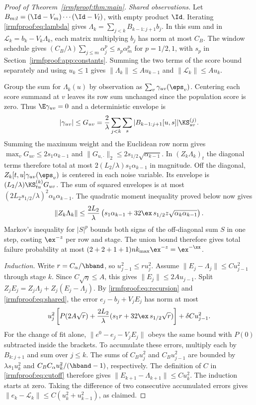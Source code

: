 \begin{proof}[Proof of Theorem~\ref{irmfproof:thm:main}]
\emph{Shared observations.}
Let \(B_{m:l}=(\Id-V_m)\cdots(\Id-V_l)\), with empty product \(\Id\).
Iterating \eqref{irmfproof:eq:lambda} gives
\(\Lambda_k=\sum_{j<k}B_{k-1:j+1}b_j\). In this sum and in
\(\mathcal L_k=b_k-V_k\Lambda_k\), each matrix multiplying \(b_j\) has norm
at most \(C_B\). The window schedule gives
\((C_B/\lambda)\sum_{j\le m}\alpha_j^p\le s_p\alpha_m^p\) for
\(p=1/2,1\), with \(s_p\) in Section~\ref{irmfproof:app:constants}.
Summing the two terms of the score bound separately and using \(u_k\le1\)
gives \(\|\Lambda_k\|\le A u_{k-1}\) and \(\|\mathcal L_k\|\le A u_k\).

Group the sum for \(\Lambda_k(u)\) by observation as
\(\sum_v\gamma_{uv}(\eps_v)\). Centering each score summand at \(v\)
leaves its row sum unchanged since the population score is zero. Thus
\(\E\gamma_{uv}=0\) and a deterministic envelope is
\[
 |\gamma_{uv}|\le G_{uv}
 =\frac{2}{\lambda}\sum_{j<k}\sum_s|B_{k-1:j+1}[u,s]|\KS_{sv}^{(j)} .
\]
Summing the maximum weight and the Euclidean row norm gives
\(\max_v G_{uv}\le2s_1\alpha_{k-1}\) and
\(\|G_{u,\cdot}\|_2\le2s_{1/2}\sqrt{\alpha_{k-1}}\).
In \((Z_k\Lambda_k)_t\) the diagonal terms therefore total at most
\(2(L_2/\lambda)s_1\alpha_{k-1}\) in magnitude. Off the diagonal,
\(Z_k[t,u]\gamma_{uv}(\eps_v)\) is centered in each noise variable.
Its envelope is \((L_2/\lambda)\KS_{tu}^{(k)}G_{uv}\).
The sum of squared envelopes is at most
\((2L_2 s_{1/2}/\lambda)^2\alpha_k\alpha_{k-1}\).
The quadratic moment inequality proved below now gives
\begin{equation}\label{irmfproof:eq:shared}
 \|Z_k\Lambda_k\|\le\frac{2L_2}{\lambda}
 \left(s_1\alpha_{k-1}+32\ex\,s_{1/2}z\sqrt{\alpha_k\alpha_{k-1}}\right) .
\end{equation}
Markov's inequality for \(|S|^p\) bounds both signs of the off-diagonal
sum \(S\) in one step, costing \(\ex^{-z}\) per row and stage.
The union bound therefore gives total failure probability at most
\((2+2+1+1)n k_{\max}\ex^{-z}=\ex^{-\xx}\).

\emph{Induction.}
Write \(r=C_\alpha/\hband\), so \(u_{j-1}^2\le r u_j^2\).
Assume \(\|E_j-\Lambda_j\|\le C u_{j-1}^2\) through stage \(k\).
Since \(C\sqrt\eta\le A\), this gives \(\|E_j\|\le2A u_{j-1}\).
Split \(Z_jE_j=Z_j\Lambda_j+Z_j(E_j-\Lambda_j)\).
By \eqref{irmfproof:eq:recursion} and \eqref{irmfproof:eq:shared}, the error
\(e_j-b_j+V_jE_j\) has norm at most
\[
 u_j^2\left[P(2A\sqrt r)+\frac{2L_2}{\lambda}
       (s_1r+32\ex\,s_{1/2}\sqrt r)\right]+\delta C u_{j-1}^2 .
\]
For the change of fit alone, \(\|e^0-e_j-V_jE_j\|\) obeys the same
bound with \(P(0)\) subtracted inside the brackets.
To accumulate these errors, multiply each by \(B_{k:j+1}\) and sum over
\(j\le k\). The sums of \(C_Bu_j^2\) and \(C_Bu_{j-1}^2\) are bounded by
\(\lambda s_1u_k^2\) and \(C_B C_\alpha u_k^2/(\hband-1)\), respectively.
The definition of \(C\) in \eqref{irmfproof:eq:cutoff} therefore gives
\(\|E_{k+1}-\Lambda_{k+1}\|\le C u_k^2\). The induction starts at zero.
Taking the difference of two consecutive accumulated errors gives
\(\|e_k-\mathcal L_k\|\le C(u_k^2+u_{k-1}^2)\), as claimed.
\end{proof}

